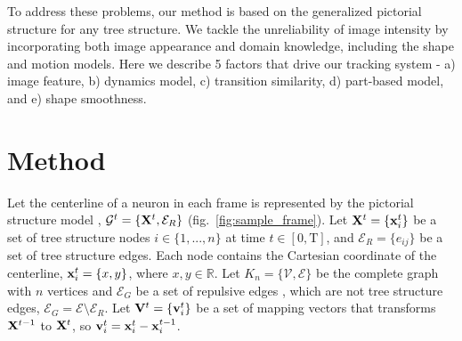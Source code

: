 \documentclass{article}
\begin{document}
To address these problems, our method is based on the generalized pictorial structure for any tree structure. We tackle the unreliability of image intensity by incorporating both image appearance and domain knowledge, including the shape and motion models. Here we describe 5 factors that drive our tracking system - a) image feature, b) dynamics model, c) transition similarity, d) part-based model, and e) shape smoothness. %

\section{Method}
\label{sec:method}

Let the centerline of a neuron in each frame is represented by the pictorial structure model \cite{Fischler1973, Felzenszwalb2005}, $\mathcal{G}^t=\{{\bf X}^t, \mathcal{E}_R\}$ (fig.~\ref{fig:sample_frame}). Let ${\bf X}^t = \{{\bf x}_i^t\}$ be a set of tree structure nodes $i \in \{1,...,n\}$ at time $t \in [0,\mathrm{T}]$, and $\mathcal{E}_R = \{e_{ij}\}$ be a set of tree structure edges. Each node contains the Cartesian coordinate of the centerline, ${\bf x}_i^t = \{x,y\}$, where $x,y \in \mathbb{R}$. Let $K_n = \{ \mathcal{V}, \mathcal{E} \}$ be the complete graph with $n$ vertices and $\mathcal{E}_G$ be a set of repulsive edges \cite{Ferrari2009}, which are not tree structure edges, $\mathcal{E}_G = \mathcal{E} \setminus \mathcal{E}_R$. Let ${\bf V}^t = \{{\bf v}_i^t\}$ be a set of mapping vectors that transforms ${\bf X}^{t-1}$ to ${\bf X}^t$, so ${\bf v}_i^t = {\bf x}_i^t - {\bf x}_i^{t-1}$. 
\end{document}
